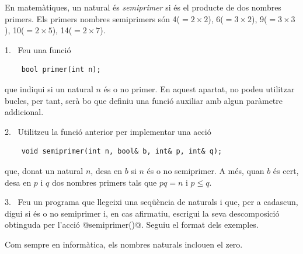 

\Statement

En matemàtiques, un natural és \emph{semiprimer} si és el
producte de dos nombres primers. Els primers nombres semiprimers són
4($= 2\times2$), 6($= 3\times2$), 9($= 3\times3$), 10($= 2\times5$), 14($= 2\times7$).

\medskip

1.~ Feu una funció

\begin{lstlisting}
    bool primer(int n);
\end{lstlisting}

que indiqui si un natural $n$ és o
no primer. En aquest apartat, no podeu utilitzar bucles, per tant, serà bo que definiu una
funció auxiliar amb algun paràmetre addicional.

\medskip

2.~ Utilitzeu la funció anterior per implementar una acció

\begin{lstlisting}
    void semiprimer(int n, bool& b, int& p, int& q);
\end{lstlisting}

que, donat un natural
$n$, desa en $b$ si $n$ és o no semiprimer. A més, quan $b$ és cert, desa en
$p$ i $q$ dos nombres primers tals que $pq=n$ i $p \le q$.


\medskip

3.~ Feu un programa que llegeixi una seqüència
de naturals i que, per a cadascun, digui si és o no semiprimer i, en cas afirmatiu,
escrigui la seva descomposició obtinguda per l'acció @semiprimer()@. Seguiu
el format dels exemples.


\Observation

Com sempre en informàtica, els nombres naturals inclouen el zero.

\Sample
